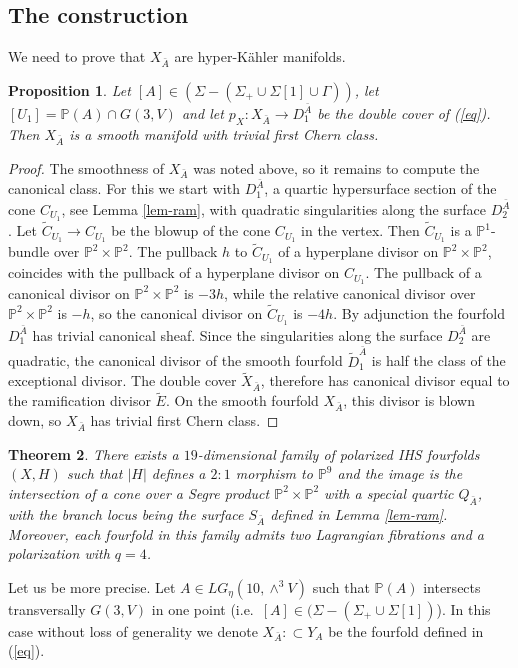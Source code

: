 \documentclass[a4paper,11pt]{amsart}
\newtheorem{thm}{Theorem}[section]
\newtheorem{prop}[thm]{Proposition}
\theoremstyle{definition}
\numberwithin{equation}{section}
\numberwithin{equation}{section} \theoremstyle{definition}
\begin{document}
\subsection{The construction} We need to prove that $X_{\bar{A}}$ are hyper-K\"ahler manifolds.

 
   \begin{prop}\label{smooth X_A} Let $[A]\in (\Sigma-(\Sigma_+\cup \Sigma[1]\cup \Gamma))$, let $[U_1]={{\mathbb{P}}}(A)\cap G(3,V)$ and let $p_X:X_{\bar{A}}\to D_1^{\bar{A}}$ be the  double cover of (\ref{eq}). Then $X_{\bar{A}}$ is a smooth manifold with trivial first Chern class. 
  \end{prop}
\medskip
 \begin{proof}  The smoothness of $X_{\bar{A}}$ was noted above, so it remains to compute the canonical class.  For this we start with $D_1^{\bar{A}}$, a quartic hypersurface section of the cone $C_{U_1}$, see Lemma \ref{lem-ram}, with quadratic singularities along the surface $D_2^{\bar{A}}$.  Let $\tilde{C}_{U_1}\to C_{U_1}$ be the blowup of the cone  $C_{U_1}$ in the vertex.  Then $\tilde{C}_{U_1}$ is a  ${{\mathbb{P}}}^1$-bundle over ${{\mathbb{P}}}^2\times{{\mathbb{P}}}^2$.  The pullback $h$ to  $\tilde{C}_{U_1}$ of a hyperplane divisor on ${{\mathbb{P}}}^2\times{{\mathbb{P}}}^2$, coincides with the pullback of a hyperplane divisor on $C_{U_1}$.  The pullback of a canonical divisor on ${{\mathbb{P}}}^2\times{{\mathbb{P}}}^2$ is $-3h$, while the relative canonical divisor over ${{\mathbb{P}}}^2\times{{\mathbb{P}}}^2$ is $-h$, so the canonical divisor on $\tilde{C}_{U_1}$ is $-4h$.  By adjunction the fourfold $D_1^{\bar{A}}$ has trivial canonical sheaf.  
 Since the singularities along the surface $D_2^{\bar{A}}$ are quadratic, the canonical divisor of the smooth fourfold $\tilde{D}_1^{\bar{A}}$ is half the class of the exceptional divisor.  The double cover $\tilde{X}_{\bar{A}}$, therefore has canonical divisor equal to the ramification divisor $\tilde{E}$.  On the smooth fourfold $X_{\bar{A}}$, this divisor is blown down, so $X_{\bar{A}}$ has trivial first Chern class.
 
 \end{proof}

\begin{thm}\label{dwa} There exists a $19$-dimensional family of polarized IHS fourfolds $(X,H)$ such that $|H|$ defines a $2:1$ morphism to 
${{\mathbb{P}}}^9$ and the image is the intersection of a cone over a Segre product ${{\mathbb{P}}}^2\times {{\mathbb{P}}}^2$ with a special quartic $Q_{\bar{A}}$,
with the branch locus being the surface $S_{\bar{A}}$ defined in Lemma \ref{lem-ram}.  Moreover, each  fourfold in this family admits two Lagrangian fibrations and a polarization with $q=4$.
\end{thm}
Let us be more precise.
Let $A\in LG_\eta(10,\wedge^3V)$ such that ${{\mathbb{P}}}(A)$ intersects transversally $G(3,V)$ in one point
(i.e.~$[A]\in (\Sigma-(\Sigma_+\cup \Sigma[1])$).
In this case without loss of generality we denote $X_{\bar{A}}:
\subset Y_A$ be the fourfold defined in (\ref{eq}).
\end{document}
